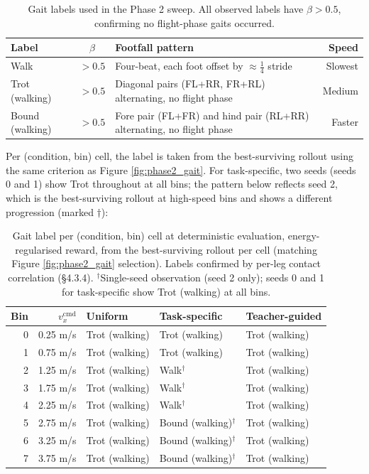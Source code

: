 \begin{table}[ht]
\centering
\begin{tabularx}{\textwidth}{@{}X c X r@{}}
\toprule
\textbf{Label} & $\beta$ & \textbf{Footfall pattern} & \textbf{Speed} \\
\midrule
Walk & $> 0.5$ & Four-beat, each foot offset by $\approx \tfrac{1}{4}$ stride & Slowest \\
\addlinespace
Trot (walking) & $> 0.5$ & Diagonal pairs (FL+RR, FR+RL) alternating, no flight phase & Medium \\
\addlinespace
Bound (walking) & $> 0.5$ & Fore pair (FL+FR) and hind pair (RL+RR) alternating, no flight phase & Faster \\
\bottomrule
\end{tabularx}
\caption{Gait labels used in the Phase 2 sweep. All observed labels have $\beta > 0.5$, confirming no flight-phase gaits occurred.}
\label{tab:gait_labels}
\end{table}

Per (condition, bin) cell, the label is taken from the best-surviving rollout using the same criterion as Figure \ref{fig:phase2_gait}. For task-specific, two seeds (seeds 0 and 1) show Trot throughout at all bins; the pattern below reflects seed 2, which is the best-surviving rollout at high-speed bins and shows a different progression (marked $\dagger$):

\begin{table}[ht]
\centering
\begin{tabularx}{\textwidth}{@{}r r X X X@{}}
\toprule
\textbf{Bin} & $v_x^{\mathrm{cmd}}$ & \textbf{Uniform} & \textbf{Task-specific} & \textbf{Teacher-guided} \\
\midrule
0 & 0.25 m/s & Trot (walking) & Trot (walking)           & Trot (walking) \\
1 & 0.75 m/s & Trot (walking) & Trot (walking)           & Trot (walking) \\
2 & 1.25 m/s & Trot (walking) & Walk$^\dagger$            & Trot (walking) \\
3 & 1.75 m/s & Trot (walking) & Walk$^\dagger$            & Trot (walking) \\
4 & 2.25 m/s & Trot (walking) & Walk$^\dagger$            & Trot (walking) \\
5 & 2.75 m/s & Trot (walking) & Bound (walking)$^\dagger$ & Trot (walking) \\
6 & 3.25 m/s & Trot (walking) & Bound (walking)$^\dagger$ & Trot (walking) \\
7 & 3.75 m/s & Trot (walking) & Bound (walking)$^\dagger$ & Trot (walking) \\
\bottomrule
\end{tabularx}
\caption{Gait label per (condition, bin) cell at deterministic evaluation, energy-regularised reward, from the best-surviving rollout per cell (matching Figure \ref{fig:phase2_gait} selection). Labels confirmed by per-leg contact correlation (\S4.3.4). $^\dagger$Single-seed observation (seed 2 only); seeds 0 and 1 for task-specific show Trot (walking) at all bins.}
\label{tab:phase2_gait}
\end{table}

